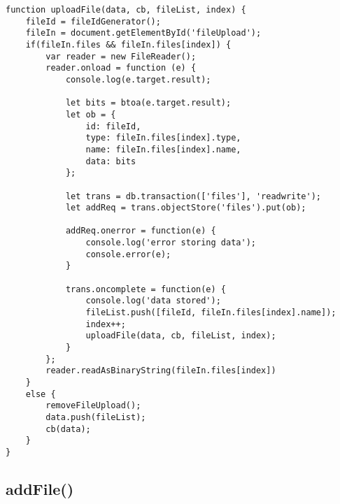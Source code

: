 \documentclass[letterpaper]{article}
\begin{document}
\begin{lstlisting}[firstnumber=38]
function uploadFile(data, cb, fileList, index) {
    fileId = fileIdGenerator();
    fileIn = document.getElementById('fileUpload');
    if(fileIn.files && fileIn.files[index]) {
        var reader = new FileReader();
        reader.onload = function (e) {
            console.log(e.target.result);

            let bits = btoa(e.target.result);
            let ob = {
                id: fileId,
                type: fileIn.files[index].type,
                name: fileIn.files[index].name,
                data: bits
            };

            let trans = db.transaction(['files'], 'readwrite');
            let addReq = trans.objectStore('files').put(ob);

            addReq.onerror = function(e) {
                console.log('error storing data');
                console.error(e);
            }

            trans.oncomplete = function(e) {
                console.log('data stored');
                fileList.push([fileId, fileIn.files[index].name]);
                index++;
                uploadFile(data, cb, fileList, index);
            }
        };
        reader.readAsBinaryString(fileIn.files[index])
    }
    else {
        removeFileUpload();
        data.push(fileList);
        cb(data);
    }
}
\end{lstlisting}

\subsection{addFile()}
\end{document}
